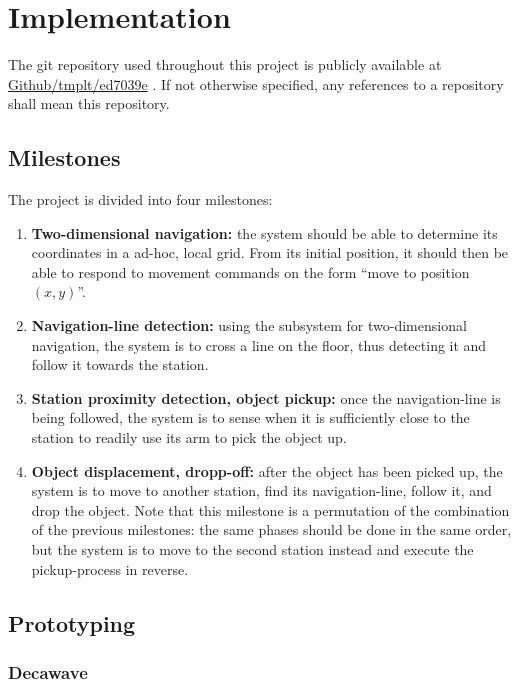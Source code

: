 \section{Implementation}
The git repository used throughout this project is publicly available at \href{https://github.com/tmplt/ed7039e}{Github/tmplt/ed7039e} \parencite{repo}.
If not otherwise specified, any references to a repository shall mean this repository.

\subsection{Milestones}
The project is divided into four milestones:
\begin{enumerate}
\item \textbf{Two-dimensional navigation:}
  the system should be able to determine its coordinates in a ad-hoc, local grid.
  From its initial position, it should then be able to respond to movement commands on the form ``move to position $(x, y)$''.

\item \textbf{Navigation-line detection:}
  using the subsystem for two-dimensional navigation, the system is to cross a line on the floor,
  thus detecting it and follow it towards the station.

\item \textbf{Station proximity detection, object pickup:}
  once the navigation-line is being followed, the system is to sense when it is sufficiently close to the station to readily use its arm to pick the object up.

\item \textbf{Object displacement, dropp-off:}
  after the object has been picked up, the system is to move to another station, find its navigation-line, follow it, and drop the object.
  Note that this milestone is a permutation of the combination of the previous milestones: the same phases should be done in the same order,
  but the system is to move to the second station instead and execute the pickup-process in reverse.
\end{enumerate}

\subsection{Prototyping}
\subsubsection{Decawave}


